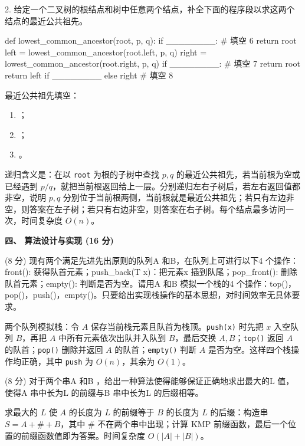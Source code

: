 \begin{question}
2. 给定一个二叉树的根结点和树中任意两个结点，补全下面的程序段以求这两个结点的最近公共祖先。
\begin{pycode}
def lowest_common_ancestor(root, p, q):
    if ________:                         # 填空 6
        return root
    left = lowest_common_ancestor(root.left, p, q)
    right = lowest_common_ancestor(root.right, p, q)
    if ________:                         # 填空 7
        return root
    return left if ________ else right   # 填空 8
\end{pycode}
\begin{solution}
最近公共祖先填空：
  \begin{enumerate}[leftmargin=2em]
    \item \texttt{}；
    \item \texttt{}；
    \item \texttt{}。
  \end{enumerate}
递归含义是：在以 \texttt{root} 为根的子树中查找 $p,q$ 的最近公共祖先，若当前根为空或已经遇到 $p/q$，就把当前根返回给上一层。分别递归左右子树后，若左右返回值都非空，说明 $p,q$ 分别位于当前根两侧，当前根就是最近公共祖先；若只有左边非空，则答案在左子树；若只有右边非空，则答案在右子树。每个结点最多访问一次，时间复杂度 $O(n)$。
\end{solution}
\end{question}

\textbf{四、 算法设计与实现 (16 分)}
\begin{question}
(8 分) 现有两个满足先进先出原则的队列A 和B，在队列上可进行以下4 个操作：front(): 获得队首元素；push\_back(T x)：把元素x 插到队尾；pop\_front(): 删除队首元素；empty(): 判断是否为空。请用A 和B 模拟一个栈的4 个操作：top()，pop()，push()，empty()。只要给出实现栈操作的基本思想，对时间效率无具体要求。
\begin{solution}
两个队列模拟栈：令 $A$ 保存当前栈元素且队首为栈顶。\texttt{push(x)} 时先把 $x$ 入空队列 $B$，再把 $A$ 中所有元素依次出队并入队到 $B$，最后交换 $A,B$；\texttt{top()} 返回 $A$ 的队首；\texttt{pop()} 删除并返回 $A$ 的队首；\texttt{empty()} 判断 $A$ 是否为空。这样四个栈操作均正确，其中 \texttt{push} 为 $O(n)$，其余为 $O(1)$。
\end{solution}
\end{question}

\begin{question}
(8 分) 对于两个串A 和B ，给出一种算法使得能够保证正确地求出最大的L 值，使得A 串中长为L 的前缀与B 串中长为L 的后缀相等。
\begin{solution}
求最大的 $L$ 使 $A$ 的长度为 $L$ 的前缀等于 $B$ 的长度为 $L$ 的后缀：构造串 $S=A+\# +B$，其中 $\#$ 不在两个串中出现；计算 KMP 前缀函数，最后一个位置的前缀函数值即为答案。时间复杂度 $O(|A|+|B|)$。
\end{solution}
\end{question}

